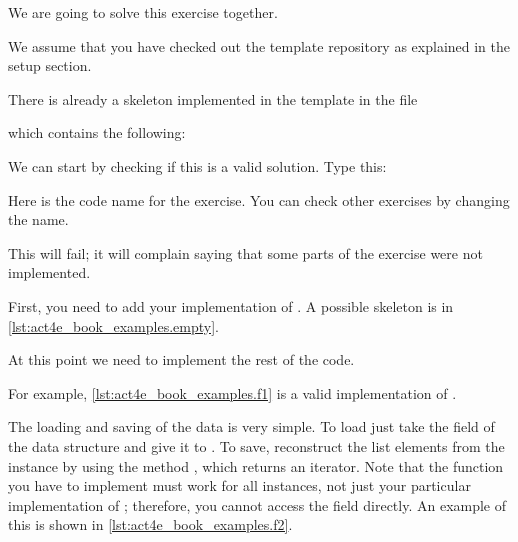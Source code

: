 We are going to solve this exercise together.

We assume that you have checked out the template repository as explained in the setup section.

There is already a skeleton implemented in the template in the file


which contains the following:

\begin{longcode}
    \caption{}

    \label{lst:act4e_book_examples.initial}
\end{longcode}

We can start by checking if this is a valid solution.
Type this:


Here  is the code name for the exercise.
You can check other exercises by changing the name.

This will fail; it will complain saying that some parts of the exercise were not implemented.


First, you need to add your implementation of .
A possible skeleton is in \cref{lst:act4e_book_examples.empty}.

\begin{longcode}
    \caption{}

    \label{lst:act4e_book_examples.empty}
\end{longcode}

At this point we need to implement the rest of the code.

For example, \cref{lst:act4e_book_examples.f1} is a valid implementation of \FiniteSet.

\begin{longcode}
    \caption{}
    \label{lst:act4e_book_examples.f1}
\end{longcode}

The loading and saving of the data is very simple.
To load just take the  field of the data structure and give it to .
To save, reconstruct the list elements from the  instance by using the method , which returns an iterator.
Note that the  function you have to implement must work for all \FiniteSet instances, not just your particular implementation of \FiniteSet; therefore, you cannot access the  field directly.
An example of this is shown in \cref{lst:act4e_book_examples.f2}.

